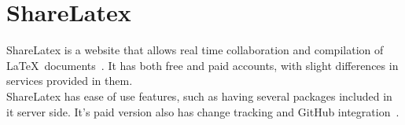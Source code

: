 \section{ShareLatex}

ShareLatex is a website that allows real time collaboration and compilation
of \LaTeX~documents~\cite{www-hid-sp18-601-slatex-documentation}. It has both 
free and paid accounts, with slight differences
 in services provided in them.\\
 
ShareLatex has ease of use features, such as having several packages included 
in it server side. It's paid version also has change tracking and GitHub
integration~\cite{www-hid-sp18-601-slatex-plans}.